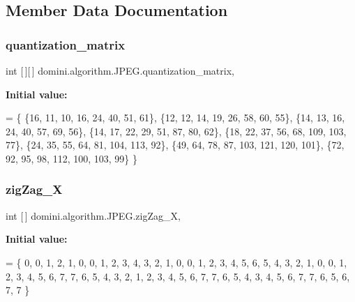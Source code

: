 \subsection{Member Data Documentation}
\mbox{\label{classdomini_1_1algorithm_1_1JPEG_a7c95eb140dbe185a31b402d48ec17a66}} 
\subsubsection{\texorpdfstring{quantization\+\_\+matrix}{quantization\_matrix}}
{\footnotesize\ttfamily int \mbox{[}$\,$\mbox{]}\mbox{[}$\,$\mbox{]} domini.\+algorithm.\+J\+P\+E\+G.\+quantization\+\_\+matrix\hspace{0.3cm}{\ttfamily [static]}, {\ttfamily [private]}}

{\bfseries Initial value\+:}
\begin{DoxyCode}
=
    \{
        \{16, 11, 10, 16, 24, 40, 51, 61\},
        \{12, 12, 14, 19, 26, 58, 60, 55\},
        \{14, 13, 16, 24, 40, 57, 69, 56\},
        \{14, 17, 22, 29, 51, 87, 80, 62\},
        \{18, 22, 37, 56, 68, 109, 103, 77\},
        \{24, 35, 55, 64, 81, 104, 113, 92\},
        \{49, 64, 78, 87, 103, 121, 120, 101\},
        \{72, 92, 95, 98, 112, 100, 103, 99\}
    \}
\end{DoxyCode}
\mbox{\label{classdomini_1_1algorithm_1_1JPEG_a7d3829cbffd758c087341a8da13dd2ca}} 
\subsubsection{\texorpdfstring{zig\+Zag\+\_\+X}{zigZag\_X}}
{\footnotesize\ttfamily int \mbox{[}$\,$\mbox{]} domini.\+algorithm.\+J\+P\+E\+G.\+zig\+Zag\+\_\+X\hspace{0.3cm}{\ttfamily [static]}, {\ttfamily [private]}}

{\bfseries Initial value\+:}
\begin{DoxyCode}
= \{
        0,
        0, 1,
        2, 1, 0,
        0, 1, 2, 3, 
        4, 3, 2, 1, 0,
        0, 1, 2, 3, 4, 5,
        6, 5, 4, 3, 2, 1, 0,
        0, 1, 2, 3, 4, 5, 6, 7,
        7, 6, 5, 4, 3, 2, 1,
        2, 3, 4, 5, 6, 7,
        7, 6, 5, 4, 3,
        4, 5, 6, 7, 
        7, 6, 5,
        6, 7,
        7
    \}
\end{DoxyCode}
\mbox{\label{classdomini_1_1algorithm_1_1JPEG_ad886d8aa00a40cb151b446534f0d1bcc}} 
